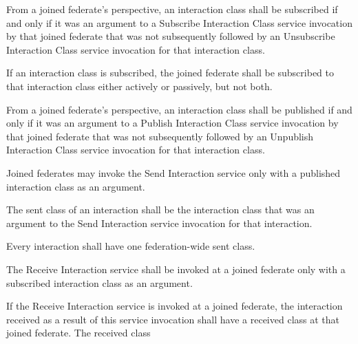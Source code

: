 \begin{compactstdpage}
    \begin{stdalphalist}
        \item From a joined federate's perspective, an interaction class shall be subscribed if and only if it was an argument to a Subscribe Interaction Class service invocation by that joined federate that was not subsequently followed by an Unsubscribe Interaction Class service invocation for that interaction class.
        \item If an interaction class is subscribed, the joined federate shall be subscribed to that interaction class either actively or passively, but not both.
        \item From a joined federate's perspective, an interaction class shall be published if and only if it was an argument to a Publish Interaction Class service invocation by that joined federate that was not subsequently followed by an Unpublish Interaction Class service invocation for that interaction class.
        \item Joined federates may invoke the Send Interaction service only with a published interaction class as an argument.
        \item The sent class of an interaction shall be the interaction class that was an argument to the Send Interaction service invocation for that interaction.
        \item Every interaction shall have one federation-wide sent class.
        \item The Receive Interaction \rtiinitiated{} service shall be invoked at a joined federate only with a subscribed interaction class as an argument.
        \item If the Receive Interaction \rtiinitiated{} service is invoked at a joined federate, the interaction received as a result of this service invocation shall have a received class at that joined federate. The received class
    \end{stdalphalist}
\end{compactstdpage}

\clearpage


